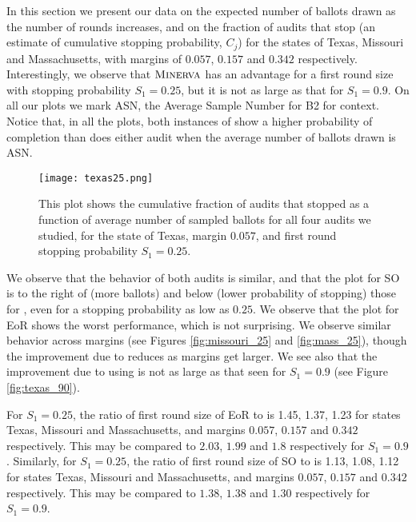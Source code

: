 In this section we present our data on the expected number of ballots drawn as the number of rounds increases, and on the fraction of audits that stop (an estimate of cumulative stopping probability, $C_j$) for the states of Texas, Missouri and Massachusetts, with margins of $0.057$, $0.157$ and $0.342$ respectively. Interestingly, we observe that $\textsc{Minerva}$ has an advantage for a first round size with stopping probability $S_1=0.25$, but it is not as large as that for $S_1=0.9$. On all our plots we mark ASN, the Average Sample Number for B2 \BRAVO for context. Notice that, in all the plots, both instances of \Minerva show a higher probability of completion than does either \BRAVO audit when the average number of ballots drawn is ASN. 

\begin{figure}
\begin{centering}
\texttt{[image: texas25.png]}
\caption{This plot shows the cumulative fraction of audits that stopped as a function of average number of sampled ballots for all four audits we studied, for the state of Texas, margin $0.057$, and first round stopping probability $S_1=0.25$.}
\label{fig:texas_25}
\end{centering}
\end{figure}

We observe that the behavior of both \Minerva audits is similar, and that the plot for SO \BRAVO is to the right of (more ballots) and below (lower probability of stopping) those for \Minerva, even for a stopping probability as low as $0.25$. We observe that the plot for EoR \BRAVO shows the worst performance, which is not surprising. We observe similar behavior across margins (see Figures \ref{fig:missouri_25} and \ref{fig:mass_25}), though the improvement due to \Minerva reduces as margins get larger. We see also that the improvement due to using \Minerva is not as large as that seen for $S_1=0.9$ (see Figure \ref{fig:texas_90}). 

For $S_1=0.25$, the ratio of first round size of EoR \BRAVO to \Minerva is 1.45, 1.37, 1.23 for states Texas, Missouri and Massachusetts, and margins $0.057$, $0.157$ and $0.342$ respectively. This may be compared to $2.03$, $1.99$ and $1.8$ respectively for $S_1=0.9$. Similarly, for $S_1=0.25$, the ratio of first round size of SO \BRAVO to \Minerva is 1.13, 1.08, 1.12 for states Texas, Missouri and Massachusetts, and margins $0.057$, $0.157$ and $0.342$ respectively. This may be compared to $1.38$, $1.38$ and $1.30$ respectively for $S_1=0.9$. 

